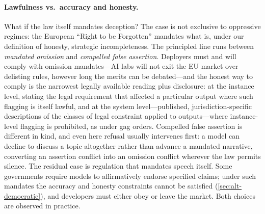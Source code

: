 \documentclass{article}
\theoremstyle{plain}
\theoremstyle{definition}
\theoremstyle{remark}
\begin{document}
\paragraph{Lawfulness vs.\ accuracy and honesty.}
What if the law itself mandates deception? The case is not exclusive to oppressive regimes: the European ``Right to be Forgotten'' \citep{googlespain2014, gdpr2016rtbf} mandates what is, under our definition of honesty, strategic incompleteness. The principled line runs between \emph{mandated omission} and \emph{compelled false assertion}. Deployers must and will comply with omission mandates---AI labs will not exit the EU market over delisting rules, however long the merits can be debated---and the honest way to comply is the narrowest legally available reading plus disclosure: at the instance level, stating the legal requirement that affected a particular output where such flagging is itself lawful, and at the system level---published, jurisdiction-specific descriptions of the classes of legal constraint applied to outputs---where instance-level flagging is prohibited, as under gag orders. Compelled false assertion is different in kind, and even here refusal usually intervenes first: a model can decline to discuss a topic altogether rather than advance a mandated narrative, converting an assertion conflict into an omission conflict wherever the law permits silence. The residual case is regulation that mandates speech itself. Some governments require models to affirmatively endorse specified claims; under such mandates the accuracy and honesty constraints cannot be satisfied (\cref{sec:alt-democratic}), and developers must either obey or leave the market. Both choices are observed in practice.
\end{document}
